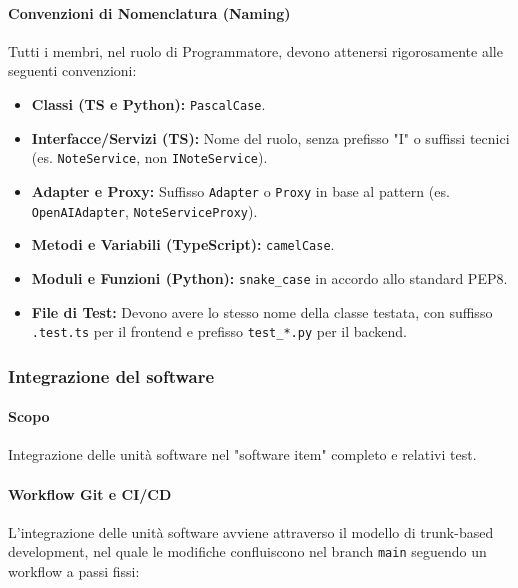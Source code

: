 \paragraph{Convenzioni di Nomenclatura (Naming)}
Tutti i membri, nel ruolo di Programmatore, devono attenersi rigorosamente alle seguenti convenzioni:
\begin{itemize}
    \item \textbf{Classi (TS e Python):} \texttt{PascalCase}.
    \item \textbf{Interfacce/Servizi (TS):} Nome del ruolo, senza prefisso "I" o suffissi tecnici (es. \texttt{NoteService}, non \texttt{INoteService}).
    \item \textbf{Adapter e Proxy:} Suffisso \texttt{Adapter} o \texttt{Proxy} in base al pattern (es. \texttt{OpenAIAdapter}, \texttt{NoteServiceProxy}).
    \item \textbf{Metodi e Variabili (TypeScript):} \texttt{camelCase}.
    \item \textbf{Moduli e Funzioni (Python):} \texttt{snake\_case} in accordo allo standard PEP8.
    \item \textbf{File di Test:} Devono avere lo stesso nome della classe testata, con suffisso \texttt{.test.ts} per il frontend e prefisso \texttt{test\_*.py} per il backend.
\end{itemize}


\subsubsection{Integrazione del software}

\paragraph{Scopo}

Integrazione delle unità software nel "software item" completo e relativi test.

\paragraph{Workflow Git e CI/CD}
L'integrazione delle unità software avviene attraverso il modello di trunk-based development, nel quale le modifiche confluiscono nel branch \texttt{main} seguendo un workflow a passi fissi:
 
